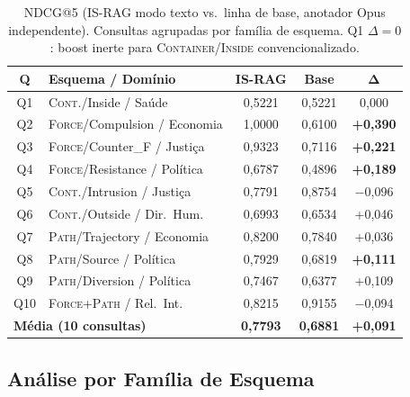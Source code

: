\documentclass[11pt,a4paper]{article}
\begin{document}
\begin{table}[H]
\centering
\small
\setlength{\tabcolsep}{4pt}
\begin{tabular}{clccc}
\toprule
\textbf{Q} & \textbf{Esquema / Domínio} & \textbf{IS-RAG} & \textbf{Base} & $\boldsymbol{\Delta}$ \\
\midrule
Q1  & \textsc{Cont.}/Inside / Saúde            & 0,5221 & 0,5221 & 0,000 \\
Q2  & \textsc{Force}/Compulsion / Economia     & 1,0000 & 0,6100 & \textbf{+0,390} \\
Q3  & \textsc{Force}/Counter\_F / Justiça      & 0,9323 & 0,7116 & \textbf{+0,221} \\
Q4  & \textsc{Force}/Resistance / Política     & 0,6787 & 0,4896 & \textbf{+0,189} \\
\midrule
Q5  & \textsc{Cont.}/Intrusion / Justiça       & 0,7791 & 0,8754 & $-$0,096 \\
Q6  & \textsc{Cont.}/Outside / Dir.\ Hum.      & 0,6993 & 0,6534 & +0,046 \\
\midrule
Q7  & \textsc{Path}/Trajectory / Economia      & 0,8200 & 0,7840 & +0,036 \\
Q8  & \textsc{Path}/Source / Política          & 0,7929 & 0,6819 & \textbf{+0,111} \\
Q9  & \textsc{Path}/Diversion / Política       & 0,7467 & 0,6377 & +0,109 \\
\midrule
Q10 & \textsc{Force+Path} / Rel.\ Int.          & 0,8215 & 0,9155 & $-$0,094 \\
\midrule
\multicolumn{2}{l}{\textbf{Média (10 consultas)}} & \textbf{0,7793} & \textbf{0,6881} & \textbf{+0,091} \\
\bottomrule
\end{tabular}
\caption{NDCG@5 (IS-RAG modo texto vs.\ linha de base, anotador Opus
  independente). Consultas agrupadas por família de esquema.
  Q1 $\Delta{=}0$: boost inerte para \textsc{Container}/\textsc{Inside}
  convencionalizado.}
\label{tab:perquery}
\end{table}


\subsection{Análise por Família de Esquema}
\end{document}
